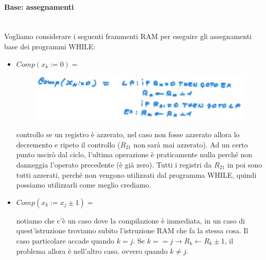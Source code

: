 \documentclass{article}
\begin{document}
\paragraph{Base: assegnamenti}\mbox{}\\
Vogliamo considerare i seguenti frammenti RAM per eseguire gli assegnamenti base dei programmi WHILE:
\begin{itemize}
    \item $Comp(x_k:=0)=$
          \begin{figure}[H]
              \centering
              \includegraphics[scale=0.4]{images/assegnamento_ram.png}
          \end{figure}
          controllo se un registro è azzerato, nel caso non fosse azzerato allora lo decremento
          e ripeto il controllo ($R_21$ non sarà mai azzerato). Ad un certo punto uscirò dal ciclo,
          l'ultima operazione è praticamente nulla perché non danneggia l'operato precedente (è già zero).
          Tutti i registri da $R_21$ in poi sono tutti azzerati, perché non vengono utilizzati dal programma
          WHILE, quindi possiamo utilizzarli come meglio crediamo.

    \item $Comp(x_k:=x_j\pm 1)=$

          notiamo che c'è un caso dove la compilazione è immediata, in un caso di quest'istruzione
          troviamo subito l'istruzione RAM che fa la stessa cosa. Il caso particolare accade quando
          $k=j$. Se $k==j\rightarrow R_k\leftarrow R_k\pm 1$, il problema allora è nell'altro caso,
          ovvero quando $k\neq j$.


\end{itemize}
\end{document}

